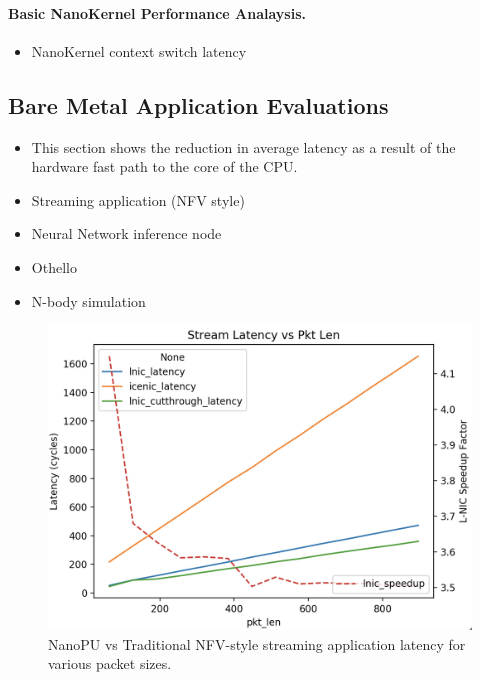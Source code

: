 \paragraph{Basic NanoKernel Performance Analaysis.}
\begin{itemize}
    \item NanoKernel context switch latency
\end{itemize}

\subsection{Bare Metal Application Evaluations}
\begin{itemize}
    \item This section shows the reduction in average latency as a result of the hardware fast path to the core of the CPU.
    \item Streaming application (NFV style)
    \item Neural Network inference node
    \item Othello
    \item N-body simulation
\end{itemize}

\begin{figure}
  \includegraphics[width=\linewidth]{./figures/stream-latency}
  \caption{NanoPU vs Traditional NFV-style streaming application latency for various packet sizes.}
  \label{fig:stream_latency}
\end{figure}

